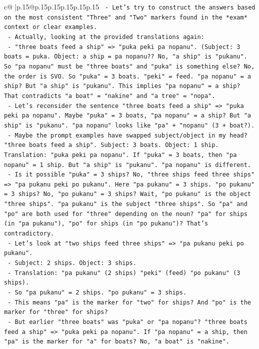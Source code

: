 \documentclass{article}
\begin{document}
{\begin{supertabular}{c@{$\;$}|p{.15\linewidth}@{}p{.15\linewidth}p{.15\linewidth}p{.15\linewidth}p{.15\linewidth}p{.15\linewidth}}
{{{\texttt{        {-} Let's try to construct the answers based on the most consistent "Three" and "Two" markers found in the *exam* context or clear examples.} \\
\texttt{        {-} Actually, looking at the provided translations again:} \\
\texttt{          {-} "three boats feed a ship" => "puka peki pa nopanu". (Subject: 3 boats = puka. Object: a ship = pa nopanu?? No, "a ship" is "pukanu". So "pa nopanu" must be "three boats" and "puka" is something else? No, the order is SVO. So "puka" = 3 boats. "peki" = feed. "pa nopanu" = a ship? But "a ship" is "pukanu". This implies "pa nopanu" = a ship? That contradicts "a boat" = "nakine" and "a tree" = "nopa".} \\
\texttt{          {-} Let's reconsider the sentence "three boats feed a ship" => "puka peki pa nopanu". Maybe "puka" = 3 boats, "pa nopanu" = a ship? But "a ship" is "pukanu". "pa nopanu" looks like "pa" + "nopanu" (3 + boat?).} \\
\texttt{          {-} Maybe the prompt examples have swapped subject/object in my head? "three boats feed a ship". Subject: 3 boats. Object: 1 ship. Translation: "puka peki pa nopanu". If "puka" = 3 boats, then "pa nopanu" = 1 ship. But "a ship" is "pukanu". "pa nopanu" is different.} \\
\texttt{          {-} Is it possible "puka" = 3 ships? No, "three ships feed three ships" => "pa pukanu peki po pukanu". Here "pa pukanu" = 3 ships. "po pukanu" = 3 ships? No, "po pukanu" = 3 ships? Wait, "po pukanu" is the object "three ships". "pa pukanu" is the subject "three ships". So "pa" and "po" are both used for "three" depending on the noun? "pa" for ships (in "pa pukanu"), "po" for ships (in "po pukanu")? That's contradictory.} \\
\texttt{          {-} Let's look at "two ships feed three ships" => "pa pukanu peki po pukanu".} \\
\texttt{            {-} Subject: 2 ships. Object: 3 ships.} \\
\texttt{            {-} Translation: "pa pukanu" (2 ships) "peki" (feed) "po pukanu" (3 ships).} \\
\texttt{            {-} So "pa pukanu" = 2 ships. "po pukanu" = 3 ships.} \\
\texttt{            {-} This means "pa" is the marker for "two" for ships? And "po" is the marker for "three" for ships?} \\
\texttt{            {-} But earlier "three boats" was "puka" or "pa nopanu"? "three boats feed a ship" => "puka peki pa nopanu". If "pa nopanu" = a ship, then "pa" is the marker for "a" for boats? No, "a boat" is "nakine".} \\
}}}
\end{supertabular}}
\end{document}

